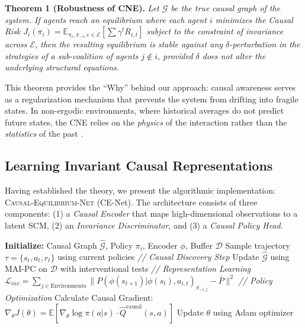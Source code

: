 \textbf{Theorem 1 (Robustness of CNE).} \textit{Let $\mathcal{G}$ be the true causal graph of the system. If agents reach an equilibrium where each agent $i$ minimizes the Causal Risk $J_i(\pi_i) = \mathbb{E}_{\pi_i, \pi_{-i}, e \in \mathcal{E}} [ \sum \gamma^t R_{i,t} ]$ subject to the constraint of invariance across $\mathcal{E}$, then the resulting equilibrium is stable against any $\delta$-perturbation in the strategies of a sub-coalition of agents $j \notin i$, provided $\delta$ does not alter the underlying structural equations.}

This theorem provides the ``Why'' behind our approach: causal awareness serves as a regularization mechanism that prevents the system from drifting into fragile states. In non-ergodic environments, where historical averages do not predict future states, the CNE relies on the \textit{physics} of the interaction rather than the \textit{statistics} of the past \cite{eichler2012causal, peters2017elements}.

\subsection{Learning Invariant Causal Representations}

Having established the theory, we present the algorithmic implementation: \textsc{Causal-Equilibrium-Net} (CE-Net). The architecture consists of three components: (1) a \textit{Causal Encoder} that maps high-dimensional observations to a latent SCM, (2) an \textit{Invariance Discriminator}, and (3) a \textit{Causal Policy Head}.

\begin{algorithm}[h]
\caption{\textsc{Causal-Equilibrium} (CE) Training Loop}
\begin{algorithmic}[1]
\STATE \textbf{Initialize:} Causal Graph $\hat{\mathcal{G}}$, Policy $\pi_i$, Encoder $\phi$, Buffer $\mathcal{D}$
    \STATE Sample trajectory $\tau = \{s_t, a_t, r_t\}$ using current policies
    \STATE \textit{// Causal Discovery Step}
    \STATE Update $\hat{\mathcal{G}}$ using MAI-PC on $\mathcal{D}$ with interventional tests \cite{pearl2009causality}
    \STATE \textit{// Representation Learning}
    \STATE $\mathcal{L}_{inv} = \sum_{j \in \text{Environments}} \| P(\phi(s_{t+1}) | \phi(s_t), a_{i,t})_{\pi_{-i, j}} - \bar{P} \|^2$ \cite{arjovsky2019invariant}
    \STATE \textit{// Policy Optimization}
    \STATE Calculate Causal Gradient: $\nabla_{\theta} J(\theta) = \mathbb{E} [ \nabla_{\theta} \log \pi(a|s) \cdot \hat{Q}^{\text{causal}}(s, a) ]$
    \STATE Update $\theta$ using Adam optimizer \cite{kingma2014adam}
\ENDFOR
\end{algorithmic}
\end{algorithm}

